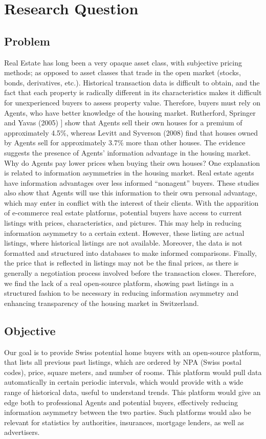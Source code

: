 \documentclass[main]{subfiles}
\begin{document}
\section{Research Question}
\subsection{Problem}
Real Estate has long been a very opaque asset class, with subjective pricing methods; 
as opposed to asset classes that trade in the open market (stocks, bonds, derivatives, etc.). Historical transaction data is difficult to obtain, and the fact that each property is radically different in its characteristics makes it difficult for unexperienced buyers to assess property value. 
Therefore, buyers must rely on Agents, who have better knowledge of the housing market. 
Rutherford, Springer and Yavas (2005)  \cite{rutherfordConflictsPrincipalsAgents2005} \hly[[3]] show that Agents sell their own houses for a premium of approximately 
4.5\%, whereas Levitt and Syverson (2008) \cite{levittMarketDistortionsWhen2005} find that houses owned by Agents sell for approximately 
3.7\% more than other houses. The evidence suggests the presence of Agents' 
information advantage in the housing market. 
Why do Agents pay lower prices when buying their own houses? One explanation is related to
 information asymmetries in the housing market. Real estate agents have information advantages over less informed “nonagent” buyers. These studies also show that Agents will use this information to their own personal advantage, which may enter in conflict with the interest of their clients.
With the apparition of e-commerce real estate platforms, potential buyers have access to current 
listings with prices, characteristics, and pictures. 
This may help in reducing information asymmetry to a certain extent. However,
 these listing are actual listings, where historical listings are not available. 
 Moreover, the data is not formatted and structured into databases to make informed comparisons. Finally, the price that is reflected in listings may not be the final prices, as there is generally a negotiation process involved before the transaction closes.
Therefore, we find the lack of a real open-source platform, showing past listings in a structured fashion to be necessary in reducing information asymmetry and enhancing transparency of the housing market in Switzerland.

\subsection{Objective}
Our goal is to provide Swiss potential home buyers with an open-source platform, that lists all previous past listings, which are ordered by NPA (Swiss postal codes), price, square meters, and number of rooms. This platform would pull data automatically in certain periodic intervals, which would provide with a wide range of historical data, useful to understand trends. This platform would give an edge both to professional Agents and potential buyers, effectively reducing information asymmetry between the two parties.
Such platforms would also be relevant for statistics by authorities, insurances, mortgage lenders, as well as advertisers.
\end{document}
